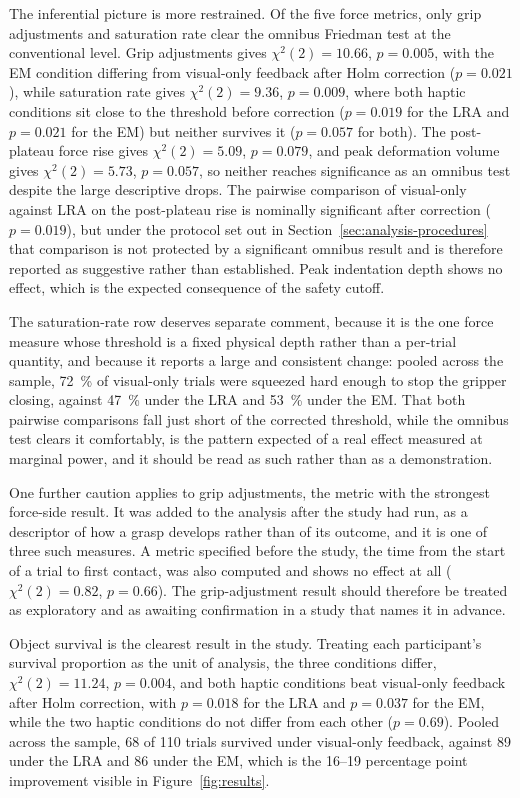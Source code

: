 \documentclass[12pt, a4paper, twoside, openright]{report}
\begin{document}
The inferential picture is more restrained. Of the five force metrics, only
grip adjustments and saturation rate clear the omnibus Friedman test at the
conventional level. Grip adjustments gives $\chi^2(2) = 10.66$, $p = 0.005$,
with the EM condition differing from visual-only feedback after Holm correction
($p = 0.021$), while saturation rate gives $\chi^2(2) = 9.36$, $p = 0.009$,
where both haptic conditions sit close to the threshold before correction
($p = 0.019$ for the LRA and $p = 0.021$ for the EM) but neither survives it
($p = 0.057$ for both). The post-plateau force rise gives $\chi^2(2) = 5.09$,
$p = 0.079$, and peak deformation volume gives $\chi^2(2) = 5.73$,
$p = 0.057$, so neither reaches significance as an omnibus test despite the
large descriptive drops. The pairwise comparison of visual-only against LRA on
the post-plateau rise is nominally significant after correction
($p = 0.019$), but under the protocol set out in
Section~\ref{sec:analysis-procedures} that comparison is not protected by a
significant omnibus result and is therefore reported as suggestive rather than
established. Peak indentation depth shows no effect, which is the expected
consequence of the safety cutoff.

The saturation-rate row deserves separate comment, because it is the one force
measure whose threshold is a fixed physical depth rather than a per-trial
quantity, and because it reports a large and consistent change: pooled across
the sample, \SI{72}{\percent} of visual-only trials were squeezed hard enough
to stop the gripper closing, against \SI{47}{\percent} under the LRA and
\SI{53}{\percent} under the EM. That both pairwise comparisons fall just short
of the corrected threshold, while the omnibus test clears it comfortably, is
the pattern expected of a real effect measured at marginal power, and it should
be read as such rather than as a demonstration.

One further caution applies to grip adjustments, the metric with the strongest
force-side result. It was added to the analysis after the study had run, as a
descriptor of how a grasp develops rather than of its outcome, and it is one of
three such measures. A metric specified before the study, the time from the
start of a trial to first contact, was also computed and shows no effect at all
($\chi^2(2) = 0.82$, $p = 0.66$). The grip-adjustment result should therefore
be treated as exploratory and as awaiting confirmation in a study that names it
in advance.

Object survival is the clearest result in the study. Treating each
participant's survival proportion as the unit of analysis, the three conditions
differ, $\chi^2(2) = 11.24$, $p = 0.004$, and both haptic conditions beat
visual-only feedback after Holm correction, with $p = 0.018$ for the LRA and
$p = 0.037$ for the EM, while the two haptic conditions do not differ from each
other ($p = 0.69$). Pooled across the sample, 68 of 110 trials survived under
visual-only feedback, against 89 under the LRA and 86 under the EM, which is
the \SIrange{16}{19}{} percentage point improvement visible in
Figure~\ref{fig:results}.
\end{document}
